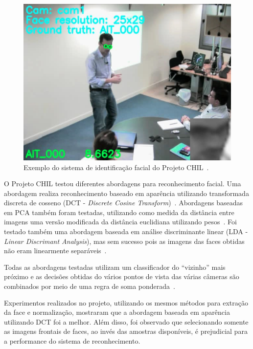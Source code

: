 	\begin{figure}[hbt]
		\begin{center}
			\includegraphics[scale=0.4]{figuras/3.TrabalhosCorrelatos/chil.png}
		\end{center}
		\caption{Exemplo do sistema de identificação facial do Projeto CHIL~\cite{chil}.}
		\label{chil}
	\end{figure}


O Projeto CHIL testou diferentes abordagens para reconhecimento facial. Uma abordagem realiza reconhecimento baseado em aparência utilizando transformada discreta de cosseno (DCT - \textit{Discrete Cosine Transform})~\cite{chilref6, chilref7}. Abordagens baseadas em PCA também foram testadas, utilizando como medida da distância entre imagens uma versão modificada da distância euclidiana utilizando pesos~\cite{chilref8, chilref9}.  Foi testado também uma abordagem baseada em análise discriminante linear (LDA - \textit{Linear Discrimant Analysis}), mas sem sucesso pois as imagens das faces obtidas não eram linearmente separáveis~\cite{chilref8, chilref9}. 

Todas as abordagens testadas utilizam um classificador do ``vizinho'' mais próximo e as decisões obtidas do vários pontos de vista das várias câmeras são combinados por meio de uma regra de soma ponderada~\cite{chilref8, chilref9}. 

Experimentos realizados no projeto, utilizando os mesmos métodos para extração da face e normalização, mostraram que a abordagem baseada em aparência utilizando DCT foi a melhor. Além disso, foi observado que selecionando somente as imagens frontais de faces, ao invés das amostras disponíveis, é prejudicial para a performance do sistema de reconhecimento. 


